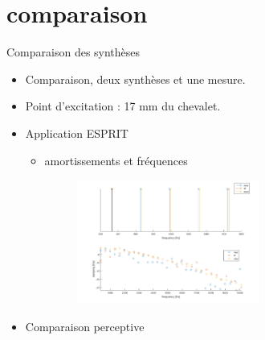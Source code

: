 \section{comparaison}

\begin{frame}{Comparaison des synthèses}
 \begin{itemize}
  \item Comparaison, deux synthèses et une mesure.
  \item Point d'excitation : 17 mm du chevalet.
  \item Application ESPRIT
  \begin{itemize}
    \item amortissements et fréquences
      \begin{figure}
		\centering
		\includegraphics[width = 6cm]{figures/apotheose.png}
	\end{figure}
  \end{itemize}
  \item Comparaison perceptive
 \end{itemize}
\end{frame}
